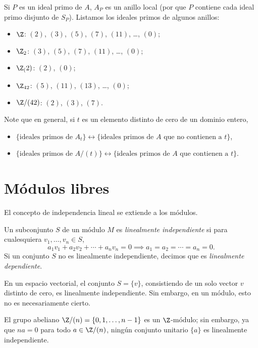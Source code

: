 \begin{example}
  Si $P$ es un ideal primo de $A$, $A_P$ es un anillo local (por que $P$ contiene cada ideal primo disjunto de $S_P$). Listamos los ideales primos de algunos anillos:
  \begin{itemize}
    \item $\Z$: $(2)$, $(3)$, $(5)$, $(7)$, $(11)$, \dots, $(0)$;
    \item $\Z_2$: $(3)$, $(5)$, $(7)$, $(11)$, \dots, $(0)$;
    \item $\Z_(2)$: $(2)$, $(0)$;
    \item $\Z_{42}$: $(5)$, $(11)$, $(13)$, \dots, $(0)$;
    \item $\Z/(42)$: $(2)$, $(3)$, $(7)$.
  \end{itemize}

  Note que en general, si $t$ es un elemento distinto de cero de un dominio entero, 
  \begin{itemize}
    \item $\{\text{ideales primos de $A_t$}\} \leftrightarrow \{\text{ideales primos de $A$ que no contienen a $t$}\}$,
    \item  $\{\text{ideales primos de $A/(t)$}\} \leftrightarrow \{\text{ideales primos de $A$ que contienen a $t$}\}$.
  \end{itemize}
\end{example}




\section{Módulos libres}

El concepto de independencia lineal se extiende a los módulos.

\begin{definition}
  Un subconjunto $S$ de un módulo $M$ es \emph{linealmente independiente} si para cualesquiera $v_1,\ldots,v_n \in S$,
    \[
      a_1 v_1 + a_2 v_2 + \cdots + a_n v_n = 0 \implies a_1 = a_2 = \cdots = a_n = 0.
    \]
  Si un conjunto $S$ no es linealmente independiente, decimos que es \emph{linealmente dependiente}.
\end{definition}

En un espacio vectorial, el conjunto $S = \{v\}$, consistiendo de un solo vector $v$ distinto de cero, es linealmente independiente. Sin embargo, en un módulo, esto no es necesariamente cierto.

\begin{example}
  El grupo abeliano $\Z/(n) = \{0,1,\ldots,n-1\}$ es un $\Z$-módulo; sin embargo, ya que $na = 0$ para todo $a \in \Z/(n)$, ningún conjunto unitario $\{a\}$ es linealmente independiente.
\end{example}

